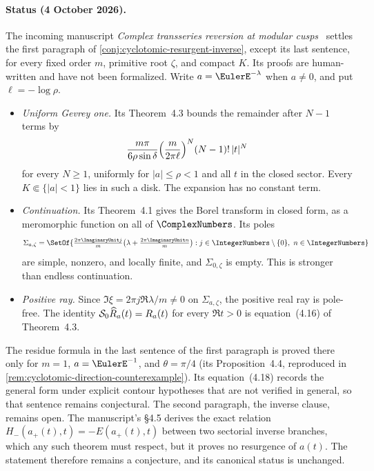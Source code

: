 \paragraph{Status (4 October 2026).}
The incoming manuscript \emph{Complex transseries reversion at modular
cusps}~\cite{ModularCuspReversion2026} settles the first paragraph of
\cref{conj:cyclotomic-resurgent-inverse}, except its last sentence, for every
fixed order \(m\), primitive root \(\zeta\), and compact \(K\).  Its proofs are
human-written and have not been formalized.  Write \(a=\EulerE^{-\lambda}\)
when \(a\ne0\), and put \(\ell=-\log\rho\).
\begin{itemize}
\item \emph{Uniform Gevrey one.}  Its Theorem~4.3 bounds the remainder after
  \(N-1\) terms by
  \[
   \frac{m\pi}{6\rho\sin\delta}
   \Bigl(\frac{m}{2\pi\ell}\Bigr)^{N}(N-1)!\,\lvert t\rvert^N
  \]
  for every \(N\ge1\), uniformly for \(\lvert a\rvert\le\rho<1\) and all \(t\)
  in the closed sector.  Every \(K\Subset\{\lvert a\rvert<1\}\) lies in such a disk.
  The expansion has no constant term.
\item \emph{Continuation.}  Its Theorem~4.1 gives the Borel transform in closed
  form, as a meromorphic function on all of \(\ComplexNumbers\).  Its poles
  \[
   \Sigma_{a,\zeta}
    =\SetOf{\tfrac{2\pi\ImaginaryUnit j}{m}
            \bigl(\lambda+\tfrac{2\pi\ImaginaryUnit n}{m}\bigr):
            j\in\IntegerNumbers\setminus\{0\},\ n\in\IntegerNumbers}
  \]
  are simple, nonzero, and locally finite, and \(\Sigma_{0,\zeta}\) is empty.  This
  is stronger than endless continuation.
\item \emph{Positive ray.}  Since \(\Im\xi=2\pi j\Re\lambda/m\ne0\) on
  \(\Sigma_{a,\zeta}\), the positive real ray is pole-free.  The identity
  \(\mathcal S_0\widehat{R}_a(t)=R_a(t)\) for every
  \(\Re t>0\) is equation~(4.16) of Theorem~4.3.
\end{itemize}
The residue formula in the last sentence of the first paragraph is proved
there only for \(m=1\),
\(a=\EulerE^{-1}\), and \(\theta=\pi/4\) (its Proposition~4.4, reproduced in
\cref{rem:cyclotomic-direction-counterexample}).  Its equation~(4.18) records the
general form under explicit contour hypotheses that are not verified in
general, so that sentence remains conjectural.  The second paragraph, the
inverse clause, remains open.  The manuscript's \S4.5 derives the exact relation
\(H_-(a_+(t),t)=-E(a_+(t),t)\) between two sectorial inverse branches, which
any such theorem must respect, but it proves no resurgence of \(a(t)\).  The
statement therefore remains a conjecture, and its canonical status is
unchanged.

